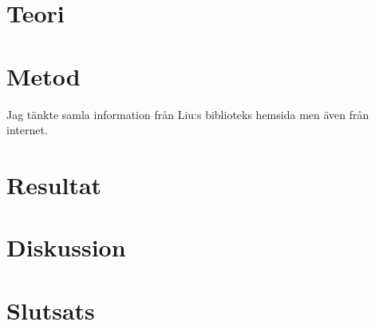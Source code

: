 \section{Teori}
\section{Metod}
Jag tänkte samla information från Liu:s biblioteks hemsida men även från internet. 
\section{Resultat}
\section{Diskussion}
\section{Slutsats}